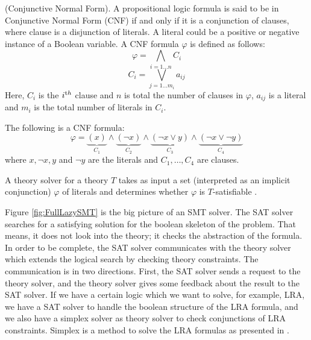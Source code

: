 \begin{definition}
\label{def:CNF}
    (Conjunctive Normal Form).
    A propositional logic formula is said to be in Conjunctive Normal Form (CNF) if and only if it is a conjunction of clauses, where clause is a disjunction of literals. A literal could be a positive or negative instance of a Boolean variable. A CNF formula $\varphi$ is defined as follows:
$$\varphi = \bigwedge\limits_{i=1\ldots n} C_{i}$$
$$ C_{i} = \bigvee\limits_{j=1\ldots m_{i}} a_{ij}$$
Here, $C_{i}$ is the $i^{\text th}$ clause and $n$ is total the number of clauses in $\varphi$, $a_{ij}$ is a literal and $m_{i}$ is the total number of literals in $C_{i}$.\newline
\begin{example}
	The following is a CNF formula:
	$$\varphi=\underbrace{(x)}\limits_{C_{1}}\wedge\underbrace{(\neg x)}\limits_{C_2}\wedge\underbrace{(\neg x\vee y)}\limits_{C_{3}}\wedge\underbrace{(\neg x \vee \neg y)}\limits_{C_{4}}$$
	where $x, \neg x, y$ and $\neg y$ are the literals and $C_{1}, \ldots, C_{4}$ are clauses.
\end{example}
\end{definition}

\noindent A theory solver for a theory $T$ takes as input a set (interpreted as an implicit conjunction) $\varphi$ of literals and determines whether $\varphi$ is $T$-satisfiable \cite{barrett2018satisfiability}.\newline

\noindent Figure \ref{fig:FullLazySMT} is the big picture of an SMT solver.
The SAT solver searches for a satisfying solution for the boolean skeleton of the problem.
That means, it does not look into the theory; it checks the abstraction of the formula.
In order to be complete, the SAT solver communicates with the theory solver which extends the logical search by checking theory constraints.
The communication is in two directions.
First, the SAT solver sends a request to the theory solver, and the theory solver gives some feedback about the result to the SAT solver.
If we have a certain logic which we want to solve, for example, LRA, we have a SAT solver to handle the boolean structure of the LRA formula, and we also have a simplex solver as theory solver to check conjunctions of LRA constraints.
Simplex is a method to solve the LRA formulas as presented in \cite{10.1007/11817963_11}.\newline

